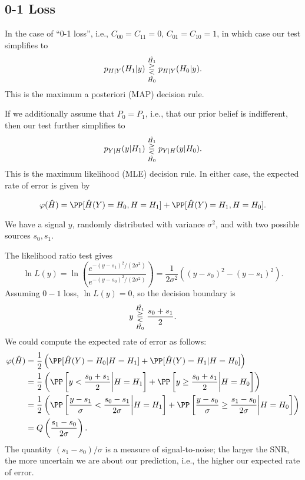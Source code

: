 \subsection{0-1 Loss}

In the case of ``0-1 loss'', i.e., $C_{00} = C_{11} = 0$, $C_{01} = C_{10} = 1$, in which case our test simplifies to 
\[p_{H|Y}(H_1|y) \overunderset{\hat{H_1}}{\hat{H_0}}{\gtreqless} p_{H|Y}(H_0|y).\]
This is the \ac{maximum a posteriori} (MAP) decision rule.

If we additionally assume that $P_0=P_1$, i.e., that our prior belief is indifferent, then our test further simplifies to 
\[p_{Y|H}(y|H_1) \overunderset{\hat{H_1}}{\hat{H_0}}{\gtreqless} p_{Y|H}(y|H_0).\] 
This is the \ac{maximum likelihood} (MLE) decision rule. In either case, the expected rate of error is given by 

\[\varphi(\hat{H}) = \PP[\hat{H}(Y) = H_0, H = H_1] + \PP[\hat{H}(Y) = H_1, H = H_0].\]

\begin{example}

We have a signal $y$, randomly distributed with variance $\sigma^2$, and with two possible sources $s_0,s_1$.
\end{example}

The likelihood ratio test gives 
\[\ln{L(y)} = \ln\left(\frac{e^{-(y-s_1)^2/(2\sigma^2)}}{e^{-(y-s_0)^2/(2\sigma^2)}}\right) = \frac{1}{2\sigma^2}((y-s_0)^2 - (y-s_1)^2).\] 
Assuming $0-1$ loss, $\ln{L(y)}=0$, so the decision boundary is 
\[y\overunderset{\hat{H_1}}{\hat{H_0}}{\gtreqless}\frac{s_0+s_1}{2}.\]
We could compute the expected rate of error as follows: 
\begin{align*}
	\varphi(\hat{H}) &= \frac{1}{2}\left(\PP[\hat{H}(Y)=H_0|H=H_1] + \PP[\hat{H}(Y)=H_1|H=H_0]\right) \\
									 &= \frac{1}{2}\left(\PP\left[y < \frac{s_0+s_1}{2}\bigg|H=H_1\right] + \PP\left[y \geq \frac{s_0+s_1}{2}\bigg|H=H_0\right]\right) \\
									 &= \frac{1}{2}\left(\PP\left[\frac{y-s_1}{\sigma} < \frac{s_0-s_1}{2\sigma}\bigg|H=H_1\right] + \PP\left[\frac{y-s_0}{\sigma} \geq \frac{s_1-s_0}{2\sigma}\bigg|H=H_0\right]\right) \\
									 &= Q\left(\frac{s_1-s_0}{2\sigma}\right).
\end{align*}
The quantity $(s_1-s_0)/\sigma$ is a measure of signal-to-noise; the larger the SNR, the more uncertain we are about our prediction, i.e., the higher our expected rate of error. 
